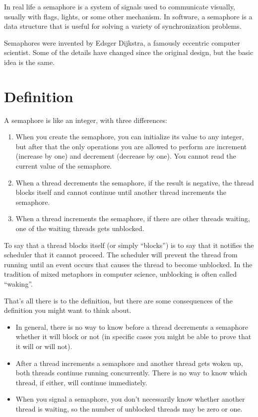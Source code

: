 In real life a semaphore is a system of signals used to communicate
visually, usually with flags, lights, or some other mechanism.  In
software, a semaphore is a data structure that is useful for solving a
variety of synchronization problems.

Semaphores were invented by Edsger Dijkstra, a famously eccentric
computer scientist.  Some of the details have changed since the
original design, but the basic idea is the same.

\section{Definition}

A semaphore is like an integer, with three differences:

\begin{enumerate}

\item When you create the semaphore, you can initialize its value to
any integer, but after that the only operations you are allowed to
perform are increment (increase by one) and decrement (decrease by
one).  You cannot read the current value of the semaphore.

\item When a thread decrements the semaphore, if the result is
negative, the thread blocks itself and cannot continue until another
thread increments the semaphore.

\item When a thread increments the semaphore, if there are other
threads waiting, one of the waiting threads gets unblocked.

\end{enumerate}

To say that a thread blocks itself (or simply ``blocks'') is to say
that it notifies the scheduler that it cannot proceed.  The scheduler
will prevent the thread from running until an event occurs that causes
the thread to become unblocked.  In the tradition of mixed metaphors
in computer science, unblocking is often called ``waking''.

That's all there is to the definition, but there are some
consequences of the definition you might want to think about.

\begin{itemize}

\item In general, there is no way to know before a thread decrements a
semaphore whether it will block or not (in specific cases you might
be able to prove that it will or will not).

\item After a thread increments a semaphore and another thread gets
woken up, both threads continue running concurrently.  There is no way
to know which thread, if either, will continue immediately.

\item When you signal a semaphore, you don't necessarily know whether
another thread is waiting, so the number of unblocked threads may
be zero or one.

\end{itemize}

